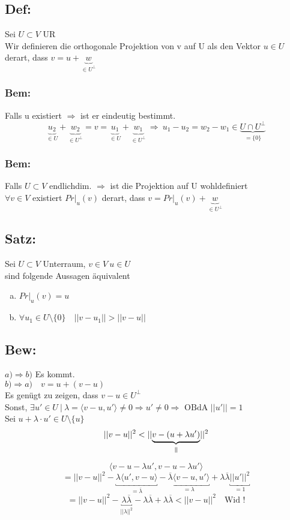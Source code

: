 \documentclass[titlepage,12pt,a4paper,ngerman]{report}
\newcommand{\verteq}{\rotatebox{90}{$\,=$}}
\newcommand{\equalto}[2]{\underset{\scriptstyle\overset{\mkern4mu\verteq}{#2}}{#1}}
\newcommand{\tx}[1]{\textrm{#1}}
\newcommand{\ub}[1]{\underbrace{#1}}
\begin{document}
\subsection{Def:}
Sei $ U \subset V $ UR\\
Wir definieren die orthogonale Projektion von v auf U als den Vektor $ u \in U $ derart, dass $ v = u+\ub{w}_{\in U^\perp}  $
\subsubsection{Bem:}
Falls u existiert $ \Rightarrow $ ist er eindeutig bestimmt.
$$ \ub{u_2}_{ \in U} + \ub{w_2}_{ \in U^\perp} = v = \ub{u_1}_{\in U} + \ub{w_1}_{\in U^\perp} \ \Rightarrow \ u_1 - u_2 = w_2 - w_1 \in \ub{U \cap U^\perp}_{= \{0\}}$$
\subsubsection{Bem:}
Falls $ U \subset V $ endlichdim. $ \Rightarrow $ ist die Projektion auf U wohldefiniert\\
$ \forall v \in V $ existiert $ Pr|_{u}(v) $ derart, dass $ v = Pr|_{u}(v) + \ub{w}_{\in U^\perp} $
\subsection{Satz:}
Sei $ U \subset V $ Unterraum, $ v \in V \ u \in U $\\
sind folgende Aussagen äquivalent
\begin{enumerate}[a)]
	\item $ Pr|_{u}(v) = u $
	\item $ \forall u_1 \in U \setminus \{0\}  \quad || v - u_1 || > || v - u ||$
\end{enumerate}
\subsection{Bew:}
$\boxed{a) \Rightarrow b)} $ Es kommt.\\
$\boxed{b) \Rightarrow a)} \quad v = u + (v - u )$\\
Es genügt zu zeigen, dass $ v-u \in U^\perp $\\
Sonst, $ \exists u' \in U \ |\ \lambda = \langle v-u, u'\rangle \neq 0 \Rightarrow u' \neq 0 \Rightarrow \tx{ OBdA } ||u'|| = 1 $\\
Sei $ u + \lambda \cdot u' \in U \setminus \{u\} $\\
$$ || v-u ||^2 < || \equalto{\ub{v - (u + \lambda u')}}{} ||^2$$ 
$$ \langle v-u - \lambda u' , v-u - \lambda u' \rangle$$
$$ = ||v-u||^2 - \underbracket{\lambda \langle u',v-u\rangle}_{= \overline{\lambda}} - \underbracket{\overline{\lambda}\langle v-u,u'\rangle}_{ = \lambda} + \lambda \overline{\lambda} \underbracket{||u'||^2}_{= 1}$$
$$ = || v-u ||^2 - \underbracket{\lambda \overline{\lambda}}_{||\lambda||^2} - \lambda \overline{\lambda} + \lambda \overline{\lambda} < || v-u ||^2 \quad \tx{Wid !}$$
\end{document}
